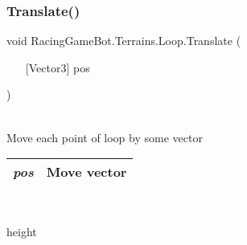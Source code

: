 \subsubsection{\texorpdfstring{Translate()}{Translate()}}
{\footnotesize\ttfamily void RacingGameBot.Terrains.Loop.Translate (\begin{itemize}
    \item[] [{Vector3}]{ pos }
\end{itemize}\hspace{0.5cm})}\\
Move each point of loop by some vector \\
\begin{tabular}{|c|c|}
\hline
{\em pos} & Move vector\\
\hline
\end{tabular}
\\ \begin{Return}
height
\end{Return}
